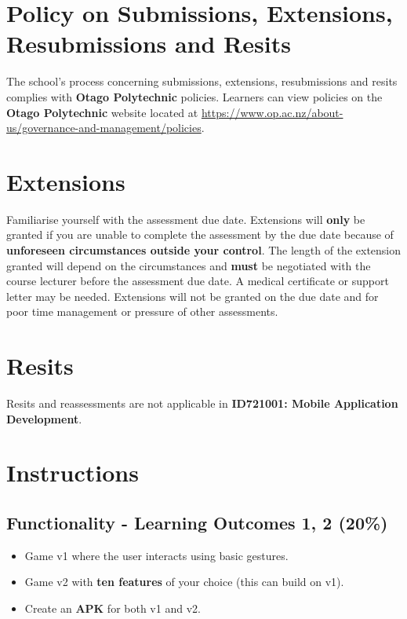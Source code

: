\documentclass{article}
\begin{document}
\section*{Policy on Submissions, Extensions, Resubmissions and Resits}
The school's process concerning submissions, extensions, resubmissions and resits complies with \textbf{Otago Polytechnic} policies. Learners can view policies on the \textbf{Otago Polytechnic} website located at \href{https://www.op.ac.nz/about-us/governance-and-management/policies}{https://www.op.ac.nz/about-us/governance-and-management/policies}. 

\section*{Extensions}
Familiarise yourself with the assessment due date. Extensions will \textbf{only} be granted if you are unable to complete the assessment by the due date because of \textbf{unforeseen circumstances outside your control}. The length of the extension granted will depend on the circumstances and \textbf{must} be negotiated with the course lecturer before the assessment due date. A medical certificate or support letter may be needed. Extensions will not be granted on the due date and for poor time management or pressure of other assessments.

\section*{Resits}
Resits and reassessments are not applicable in \textbf{ID721001: Mobile Application Development}.

\newpage

\section*{Instructions}

\subsection*{Functionality - Learning Outcomes 1, 2 (20\%)}
\begin{itemize}
  \item Game v1 where the user interacts using basic gestures.
  \item Game v2 with \textbf{ten features} of your choice (this can build on v1).
  \item Create an \textbf{APK} for both v1 and v2.
\end{itemize}   
\end{document}
